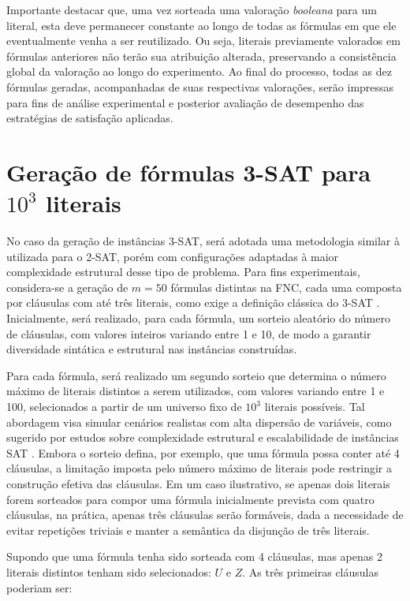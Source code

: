 Importante destacar que, uma vez sorteada uma valoração \textit{booleana} para um literal, esta deve permanecer constante ao longo de todas as fórmulas em que ele eventualmente venha a ser reutilizado. Ou seja, literais previamente valorados em fórmulas anteriores não terão sua atribuição alterada, preservando a consistência global da valoração ao longo do experimento. Ao final do processo, todas as dez fórmulas geradas, acompanhadas de suas respectivas valorações, serão impressas para fins de análise experimental e posterior avaliação de desempenho das estratégias de satisfação aplicadas.

\section{Geração de fórmulas 3-SAT para $10^3$ literais}

No caso da geração de instâncias 3-SAT, será adotada uma metodologia similar à utilizada para o 2-SAT, porém com configurações adaptadas à maior complexidade estrutural desse tipo de problema. Para fins experimentais, considera-se a geração de $m = 50$ fórmulas distintas na FNC, cada uma composta por cláusulas com até três literais, como exige a definição clássica do 3-SAT \cite{el2016computational}. Inicialmente, será realizado, para cada fórmula, um sorteio aleatório do número de cláusulas, com valores inteiros variando entre 1 e 10, de modo a garantir diversidade sintática e estrutural nas instâncias construídas.  

Para cada fórmula, será realizado um segundo sorteio que determina o número máximo de literais distintos a serem utilizados, com valores variando entre 1 e 100, selecionados a partir de um universo fixo de $10^3$ literais possíveis. Tal abordagem visa simular cenários realistas com alta dispersão de variáveis, como sugerido por estudos sobre complexidade estrutural e escalabilidade de instâncias SAT \cite{coarfa2003random}. Embora o sorteio   defina, por exemplo, que uma fórmula possa conter até 4 cláusulas, a limitação imposta pelo número máximo de literais pode restringir a construção efetiva das cláusulas. Em um caso ilustrativo, se apenas dois literais forem sorteados para compor uma fórmula inicialmente prevista com quatro cláusulas, na prática, apenas três cláusulas serão formáveis, dada a necessidade de evitar repetições triviais e manter a semântica da disjunção de três literais.

Supondo que uma fórmula tenha sido sorteada com 4 cláusulas, mas apenas 2 literais distintos tenham sido selecionados: $U$ e $Z$. As três primeiras cláusulas poderiam ser:

